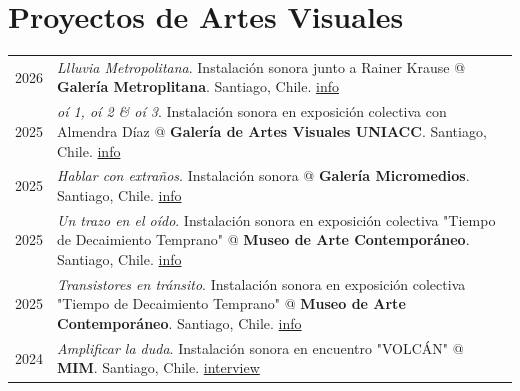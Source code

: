 \documentclass[a4paper,11pt]{article}
\begin{document}

\section{Proyectos de Artes Visuales}
\begin{tabularx}{\linewidth}{@{}l X@{}}	

2026 & \textit{Llluvia Metropolitana}. Instalación sonora junto a Rainer Krause @  \textbf{Galería Metroplitana}. Santiago, Chile. \hfill \normalsize \href{https://misaa.cc/projects/llluviametropolitana.html.html}{info} \\

2025 & \textit{oí 1, oí 2 \& oí 3}. Instalación sonora en exposición colectiva con Almendra Díaz @  \textbf{Galería de Artes Visuales UNIACC}. Santiago, Chile. \hfill \normalsize \href{https://misaa.cc/projects/cuandotodaslaspalabras.html}{info} \\

2025 & \textit{Hablar con extraños}. Instalación sonora @  \textbf{Galería Micromedios}. Santiago, Chile. \hfill \normalsize \href{https://translab.uchilefau.cl/hablar-con-extranos/}{info} \\

2025 & \textit{Un trazo en el oído}. Instalación sonora en exposición colectiva "Tiempo de Decaimiento Temprano" @  \textbf{Museo de Arte Contemporáneo}. Santiago, Chile. \hfill \normalsize \href{https://misaa.cc/projects/untrazoeneloido.html/}{info} \\
2025 & \textit{Transistores en tránsito}. Instalación sonora en exposición colectiva "Tiempo de Decaimiento Temprano" @  \textbf{Museo de Arte Contemporáneo}. Santiago, Chile. \hfill \normalsize \href{https://misaa.cc/projects/transistoresentransito.html}{info} \\

2024 & \textit{Amplificar la duda}. Instalación sonora en encuentro "VOLCÁN" @  \textbf{MIM}. Santiago, Chile. \hfill \normalsize \href{https://mim.cl/noticia/matias-serrano-escuchar-necesariamente-tiene-que-ver-con-el-presente-y-el-aqui-y-el-ahora/}{interview} \\


\end{tabularx}
\end{document}
